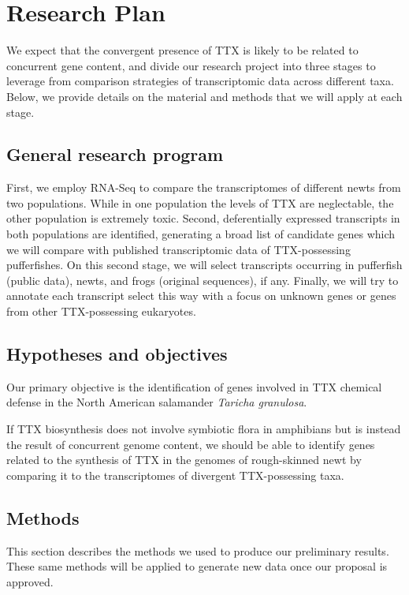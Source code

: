 \section{Research Plan}

We expect that the convergent presence of TTX is likely to be related to concurrent gene content, and divide our research project into three stages to leverage from comparison strategies of transcriptomic data across different taxa. Below, we provide details on the material and methods that we will apply at each stage.

\subsection{General research program}

First, we employ RNA-Seq to compare the transcriptomes of different newts from two populations. While in one population the levels of TTX are neglectable, the other population is extremely toxic. Second, deferentially expressed transcripts in both populations are identified, generating a broad list of candidate genes which we will compare with published transcriptomic data of TTX-possessing pufferfishes. On this second stage, we will select transcripts occurring in pufferfish (public data), newts, and frogs (original sequences), if any. Finally, we will try to annotate each transcript select this way with a focus on unknown genes or genes from other TTX-possessing eukaryotes.

\subsection{Hypotheses and objectives}

Our primary objective is the identification of genes involved in TTX chemical defense in the North American salamander \textit{Taricha granulosa}.

If TTX biosynthesis does not involve symbiotic flora in amphibians but is instead the result of concurrent genome content, we should be able to identify genes related to the synthesis of TTX in the genomes of rough-skinned newt by comparing it to the transcriptomes of divergent TTX-possessing taxa.

\subsection{Methods}

This section describes the methods we used to produce our preliminary results. These same methods will be applied to generate new data once our proposal is approved.

